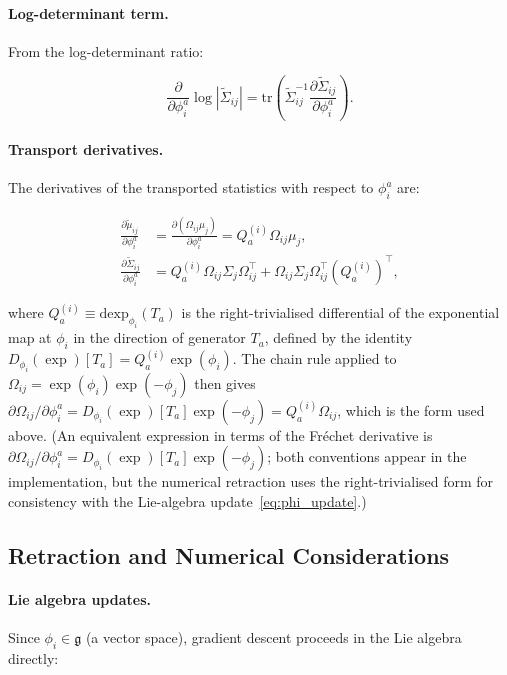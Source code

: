 \documentclass[twoside,11pt]{article}
\begin{document}
\paragraph{Log-determinant term.} From the log-determinant ratio:

\begin{equation}
\frac{\partial}{\partial \phi_i^a}\log|\tilde{\Sigma}_{ij}|
= \mathrm{tr} \left(\tilde{\Sigma}_{ij}^{-1} \frac{\partial \tilde{\Sigma}_{ij}}{\partial \phi_i^a}\right).
\label{eq:logdet_term_phi}
\end{equation}

\paragraph{Transport derivatives.} The derivatives of the transported statistics with respect to $\phi_i^a$ are:

\begin{align}
\frac{\partial \tilde{\mu}_{ij}}{\partial \phi_i^a} &= \frac{\partial (\Omega_{ij}\mu_j)}{\partial \phi_i^a}
= Q_a^{(i)} \Omega_{ij} \mu_j, \label{eq:dtilde_mu} \\
\frac{\partial \tilde{\Sigma}_{ij}}{\partial \phi_i^a} &=
Q_a^{(i)} \Omega_{ij} \Sigma_j \Omega_{ij}^\top
+ \Omega_{ij} \Sigma_j \Omega_{ij}^\top (Q_a^{(i)})^\top, \label{eq:dtilde_Sigma}
\end{align}

where $Q_a^{(i)} \equiv \mathrm{dexp}_{\phi_i}(T_a)$ is the right-trivialised differential of the exponential map at $\phi_i$ in the direction of generator $T_a$, defined by the identity $D_{\phi_i}(\exp)[T_a] = Q_a^{(i)} \exp(\phi_i)$. The chain rule applied to $\Omega_{ij} = \exp(\phi_i)\exp(-\phi_j)$ then gives $\partial \Omega_{ij}/\partial \phi_i^a = D_{\phi_i}(\exp)[T_a] \exp(-\phi_j) = Q_a^{(i)} \Omega_{ij}$, which is the form used above. (An equivalent expression in terms of the Fréchet derivative is $\partial \Omega_{ij}/\partial \phi_i^a = D_{\phi_i}(\exp)[T_a] \exp(-\phi_j)$; both conventions appear in the implementation, but the numerical retraction uses the right-trivialised form for consistency with the Lie-algebra update~\eqref{eq:phi_update}.)

\subsection{Retraction and Numerical Considerations}

\paragraph{Lie algebra updates.} Since $\phi_i \in \mathfrak{g}$ (a vector space), gradient descent proceeds in the Lie algebra directly:
\end{document}
